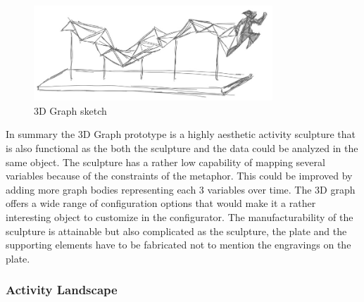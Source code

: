 \documentclass[../medieninformatik-arbeit.tex]{subfiles}
\begin{document}
\begin{figure}[h]
\captionsetup{width=0.8\textwidth}
\begin{center}
  \includegraphics[width=0.8\textwidth]{Prototype/img/3DGraph_detail}
  \caption{3D Graph sketch}
\label{fig:3DgraphDetail}
\end{center}
\end{figure}

In summary the 3D Graph prototype is a highly aesthetic activity sculpture that is also functional as the both the sculpture and the data could be analyzed in the same object. The sculpture has a rather low capability of mapping several variables because of the constraints of the metaphor. This could be improved by adding more graph bodies representing each 3 variables over time. The 3D graph offers a wide range of configuration options that would make it a rather interesting object to customize in the configurator. The manufacturability of the sculpture is attainable but also complicated as the sculpture, the plate and the supporting elements have to be fabricated not to mention the engravings on the plate. 

\subsubsection{Activity Landscape}
\end{document}
